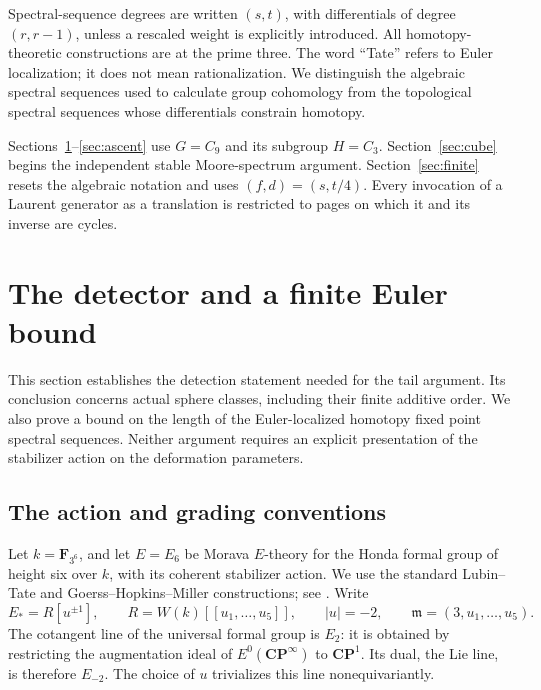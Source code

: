 \documentclass[11pt]{article}
\theoremstyle{definition}
\theoremstyle{remark}
\numberwithin{equation}{section}
\begin{document}
Spectral-sequence degrees are written $(s,t)$, with differentials of degree $(r,r-1)$, unless a rescaled weight is explicitly introduced. All homotopy-theoretic constructions are at the prime three. The word ``Tate'' refers to Euler localization; it does not mean rationalization. We distinguish the algebraic spectral sequences used to calculate group cohomology from the topological spectral sequences whose differentials constrain homotopy.

Sections~\ref{sec:detector}--\ref{sec:ascent} use $G=C_9$ and its subgroup $H=C_3$. Section~\ref{sec:cube} begins the independent stable Moore-spectrum argument. Section~\ref{sec:finite} resets the algebraic notation and uses $(f,d)=(s,t/4)$. Every invocation of a Laurent generator as a translation is restricted to pages on which it and its inverse are cycles.

 
\tableofcontents
 
\section{The detector and a finite Euler bound}\label{sec:detector}

This section establishes the detection statement needed for the tail
argument.  Its conclusion concerns actual sphere classes, including
their finite additive order.  We also prove a bound on the length of
the Euler-localized homotopy fixed point spectral sequences.  Neither
argument requires an explicit presentation of the stabilizer action
on the deformation parameters.

\subsection{The action and grading conventions}

Let \(k=\mathbf F_{3^6}\), and let \(E=E_6\) be Morava \(E\)-theory for the
Honda formal group of height six over \(k\), with its coherent
stabilizer action.  We use the standard Lubin--Tate and
Goerss--Hopkins--Miller constructions; see \cite{LubinTate,GH}.
Write
\begin{equation}\label{det:coefficients}
 E_* = R[u^{\pm1}],\qquad
 R=W(k)[[u_1,\ldots,u_5]],\qquad
 |u|=-2,\qquad
 \mathfrak m=(3,u_1,\ldots,u_5).
\end{equation}
The cotangent line of the universal formal group is \(E_2\):
it is obtained by restricting the augmentation ideal of
\(E^0(\mathbf{CP}^{\infty})\) to \(\mathbf{CP}^1\).
Its dual, the Lie line, is therefore \(E_{-2}\).
The choice of \(u\) trivializes this line nonequivariantly.
\end{document}

